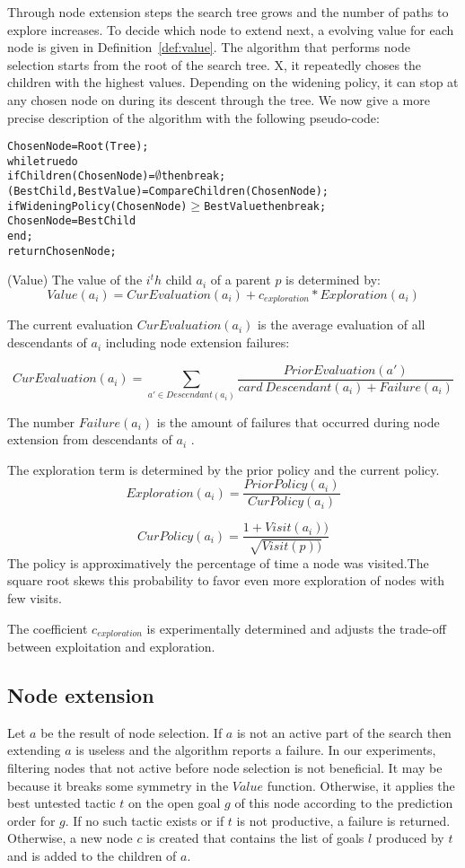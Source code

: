 \documentclass[runningheads,a4paper,draft]{svjour3}
\newcommand{\todoi}[1]{\todo[inline]{#1}}
\begin{document}
Through node extension steps the search tree grows and the number of paths to 
explore increases. To decide which node to extend next, a evolving value for 
each node is given in Definition~\ref{def:value}. The algorithm that performs 
node selection starts from the root of the search tree. X, it repeatedly choses 
the children with the highest values. Depending on the widening policy, it can 
stop at any chosen node on during its descent through the tree. We now give a 
more precise description of 
the algorithm with the following pseudo-code:  

\todoi{Replace alltt environment by something prettier}
\begin{alltt}
ChosenNode = Root(Tree);
while true do
  if Children(ChosenNode) = \(\emptyset\) then break;
  (BestChild, BestValue) = CompareChildren (ChosenNode);
  if WideningPolicy (ChosenNode) \(\geq\) BestValue then break;
  ChosenNode = BestChild
end;
return ChosenNode;
\end{alltt}

\begin{definition}\label{def:value}(Value)
The value of the $i^th$ child $a_i$ of a parent $p$ is determined by:
\[Value(a_i) = CurEvaluation(a_i) + c_{exploration} * Exploration(a_i)\] 

The current evaluation $CurEvaluation(a_i)$ is the average evaluation of 
all descendants of $a_i$ including node extension 
failures:

\[CurEvaluation(a_i) = 
  \sum_{a' \in Descendant(a_i)} \frac{PriorEvaluation(a')} {card\ 
  Descendant(a_i) + Failure(a_i)}\]

The number $Failure(a_i)$ is the amount of failures that occurred during node 
extension from descendants of $a_i$ .

The exploration term is determined by the prior policy and the current policy.
\[Exploration(a_i) = \frac{PriorPolicy(a_i)}{CurPolicy(a_i)}\]

\[CurPolicy(a_i) = \frac{1 + Visit(a_i))}{\sqrt{Visit(p))}}\]
The policy is approximatively the  percentage of time a node was visited.The 
square root skews this probability to favor even more exploration of nodes with 
few visits. 

The coefficient $c_{exploration}$ is experimentally determined and adjusts the 
trade-off between exploitation and exploration.
\end{definition}

\subsection{Node extension}
Let $a$ be the result of node selection.
If $a$ is not an active part of the search then extending $a$ is useless and 
the algorithm reports a failure. In our experiments, filtering nodes that not 
active before node selection is 
not beneficial. It may be because it breaks some symmetry in the 
$Value$ function. 
Otherwise, it applies the best untested tactic $t$ on the open goal $g$ of this 
node according to the prediction order for $g$. If no such tactic exists or if 
$t$ is not productive, a failure is returned. 
Otherwise, a new node $c$ is created that contains the list of goals $l$ 
produced by $t$ and is added to the children of $a$.
 
\end{document}
